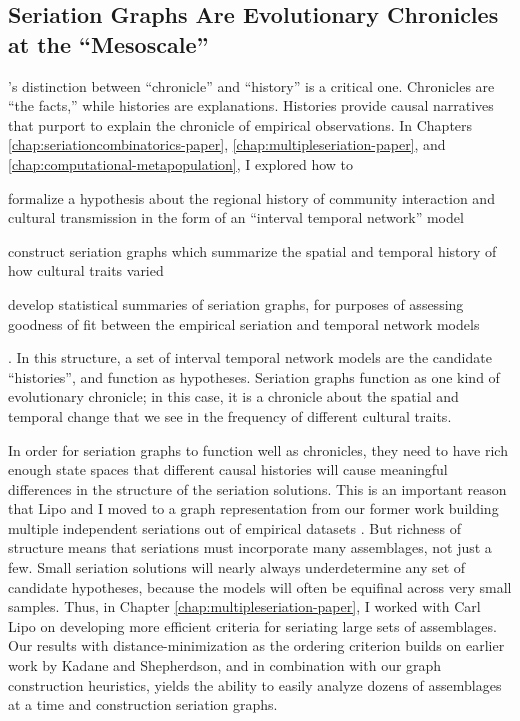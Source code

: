 \subsection{Seriation Graphs Are Evolutionary Chronicles at the ``Mesoscale''}\label{conc:sec:conc-seriation}

\citet{OHara1988}'s distinction between ``chronicle'' and ``history'' is a critical one.  Chronicles are ``the facts,'' while histories are explanations.  Histories provide causal narratives that purport to explain the chronicle of empirical observations. In Chapters \ref{chap:seriationcombinatorics-paper}, \ref{chap:multipleseriation-paper}, and \ref{chap:computational-metapopulation}, I explored how to \begin{dissparalist}
\item formalize a hypothesis about the regional history of community interaction and cultural transmission in the form of an ``interval temporal network'' model
\item construct seriation graphs which summarize the spatial and temporal history of how cultural traits varied 
\item develop statistical summaries of seriation graphs, for purposes of assessing goodness of fit between the empirical seriation and temporal network models
\end{dissparalist}.  In this structure, a set of interval temporal network models are the candidate ``histories'', and function as hypotheses.  Seriation graphs function as one kind of evolutionary chronicle; in this case, it is a chronicle about the spatial and temporal change that we see in the frequency of different cultural traits.  

In order for seriation graphs to function well as chronicles, they need to have rich enough state spaces that different causal histories will cause meaningful differences in the structure of the seriation solutions.  This is an important reason that Lipo and I moved to a graph representation from our former work building multiple independent seriations out of empirical datasets \citep{Lipo2015}.  But richness of structure means that seriations must incorporate many assemblages, not just a few.  Small seriation solutions will nearly always underdetermine any set of candidate hypotheses, because the models will often be equifinal across very small samples.  Thus, in Chapter \ref{chap:multipleseriation-paper}, I worked with Carl Lipo on developing more efficient criteria for seriating large sets of assemblages.  Our results with distance-minimization as the ordering criterion builds on earlier work by Kadane and Shepherdson, and in combination with our graph construction heuristics, yields the ability to easily analyze dozens of assemblages at a time and construction seriation graphs.  

